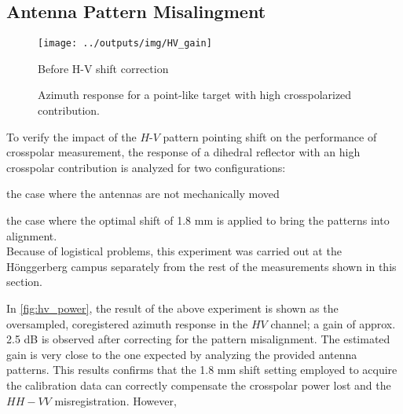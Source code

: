 \subsection{Antenna Pattern Misalingment}
\begin{figure}[ht!]
	\centering
	\texttt{[image: ../outputs/img/HV\_gain]}
	\caption{Before H-V shift correction}
	\label{fig:hv_power:uncalibrated}
	\caption{Azimuth response for a point-like target with high crosspolarized contribution.}
	\label{fig:hv_power}
\end{figure}
To verify the impact of the $H$-$V$ pattern pointing shift on the performance of crosspolar measurement, the response of a dihedral reflector with an high crosspolar contribution is analyzed for two configurations:\\ \begin{enumerate*}\item the case where the antennas are not mechanically moved \item the case where the optimal shift of 1.8 mm is applied to bring the patterns into alignment.\\ Because of logistical problems, this experiment was carried out at the H\"{o}nggerberg campus separately from the rest of the measurements shown in this section.
\end{enumerate*}
In \autoref{fig:hv_power}, the result of the above experiment is shown as the oversampled, coregistered azimuth response in the $HV$ channel; a gain of approx. 2.5 dB is observed after correcting for the pattern misalignment. The estimated gain is very close to the one expected by analyzing the provided antenna patterns. This results confirms that the 1.8 mm shift setting employed to acquire the calibration data can correctly compensate the crosspolar power lost and the $HH-VV$ misregistration. However,  
